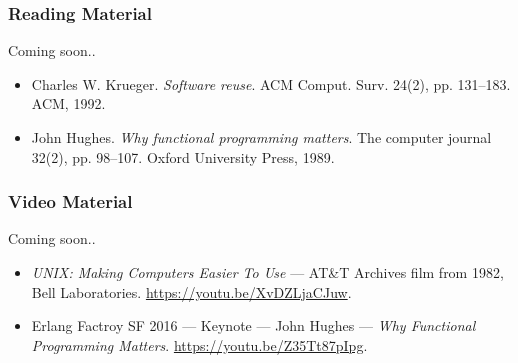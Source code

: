 \begin{frame}

\frametitle{Reading Material}

\begin{center}

Coming soon..

\end{center}

\footnotesize

\begin{itemize}

\item Charles W. Krueger. \emph{Software reuse}. ACM Comput. Surv. 24(2),
pp. 131--183. ACM, 1992.

\item John Hughes. \emph{Why functional programming matters}. The computer
journal 32(2), pp. 98--107. Oxford University Press, 1989.

\end{itemize}

\end{frame}


\begin{frame}

\frametitle{Video Material}

\begin{center}

Coming soon..

\end{center}

\footnotesize

\begin{itemize}

\item \emph{UNIX: Making Computers Easier To Use} --- AT\&T Archives film from
1982, Bell Laboratories. \url{https://youtu.be/XvDZLjaCJuw}.

\item Erlang Factroy SF 2016 --- Keynote --- John Hughes --- \emph{Why
Functional Programming Matters}. \url{https://youtu.be/Z35Tt87pIpg}.

\end{itemize}

\end{frame}

